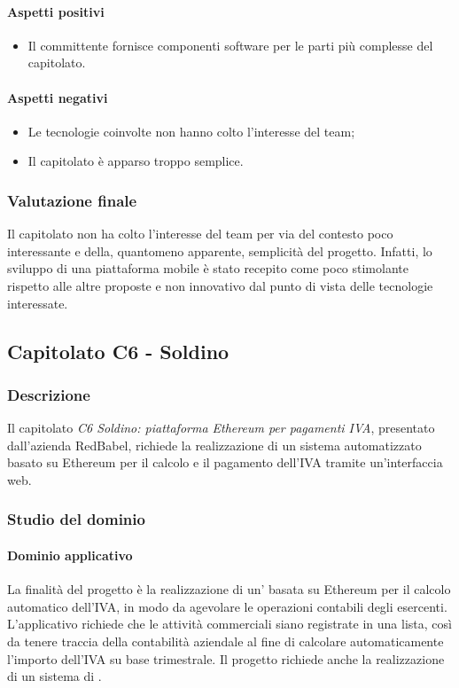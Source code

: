 \paragraph{Aspetti positivi}
\begin{itemize}
	\item Il committente fornisce componenti software per le parti più complesse del capitolato.
\end{itemize}
\paragraph{Aspetti negativi}
\begin{itemize}
	\item Le tecnologie coinvolte non hanno colto l'interesse del team;
	\item Il capitolato è apparso troppo semplice.
\end{itemize}
\subsubsection{Valutazione finale}
Il capitolato non ha colto l'interesse del team per via del contesto poco interessante e della, quantomeno apparente, semplicità del progetto. Infatti, lo 				sviluppo di una piattaforma mobile è stato recepito come poco stimolante rispetto alle altre proposte e non innovativo dal punto di vista delle tecnologie 					interessate. 
		
		
	\subsection{Capitolato C6 - Soldino}
		\subsubsection{Descrizione}
		Il capitolato \emph{C6 Soldino: piattaforma Ethereum per pagamenti IVA}, presentato dall'azienda RedBabel, richiede la realizzazione di un sistema automatizzato basato su Ethereum per il calcolo e il pagamento dell'IVA tramite un'interfaccia web.
		\subsubsection{Studio del dominio}
			\paragraph{Dominio applicativo} \Spazio
			La finalità del progetto è la realizzazione di un' basata su Ethereum per il calcolo automatico dell'IVA, in modo da agevolare le operazioni contabili degli esercenti. L'applicativo richiede che le attività commerciali siano registrate in una lista, così da tenere traccia della contabilità aziendale al fine di calcolare automaticamente l'importo dell'IVA su base trimestrale. Il progetto richiede anche la realizzazione di un sistema di .
			

